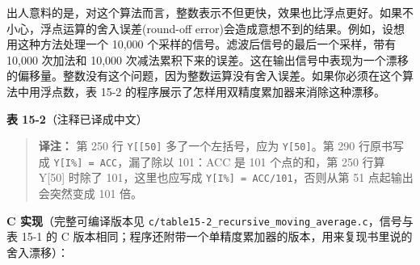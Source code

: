 出人意料的是，对这个算法而言，整数表示不但更快，效果也比浮点更好。如果不小心，浮点运算的舍入误差(round-off
error)会造成意想不到的结果。例如，设想用这种方法处理一个 10,000
个采样的信号。滤波后信号的最后一个采样，带有 10,000 次加法和 10,000
次减法累积下来的误差。这在输出信号中表现为一个漂移的偏移量。整数没有这个问题，因为整数运算没有舍入误差。如果你必须在这个算法中用浮点数，表
15-2 的程序展示了怎样用双精度累加器来消除这种漂移。

\textbf{表 15-2}（注释已译成中文）

\begin{Shaded}
\begin{Highlighting}[]
\NormalTok{140 \textquotesingle{}}
\NormalTok{180 \textquotesingle{}}
\NormalTok{200 \textquotesingle{}}
\NormalTok{250 Y[[50] = ACC/101}
\NormalTok{310 \textquotesingle{}}
\end{Highlighting}
\end{Shaded}

\begin{quote}
\textbf{译注：} 第 250 行 \texttt{Y{[}{[}50{]}} 多了一个左括号，应为
\texttt{Y{[}50{]}}。第 290 行原书写成
\texttt{Y{[}I\%{]}\ =\ ACC}，漏了除以 101：ACC 是 101 个点的和，第 250
行算 Y{[}50{]} 时除了 101，这里也应写成
\texttt{Y{[}I\%{]}\ =\ ACC/101}，否则从第 51 点起输出会突然变成 101 倍。
\end{quote}

\textbf{C 实现}（完整可编译版本见
\texttt{c/table15-2\_recursive\_moving\_average.c}，信号与表 15-1 的 C
版本相同；程序还附带一个单精度累加器的版本，用来复现书里说的舍入漂移）：

